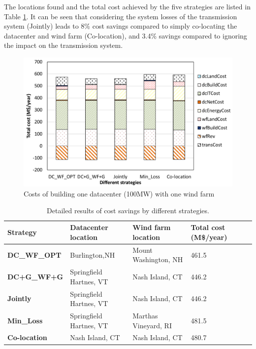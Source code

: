 The locations found and the total cost achieved by the five
strategies are listed in Table \ref{tab:costsaving}. It can be seen that 
considering the system losses of the transmission system (Jointly) leads to
 8\% cost 
savings compared to simply co-locating the datacenter and wind farm
(Co-location), and 3.4\% savings compared to ignoring the impact on
the transmission system.

\begin{figure}[ht]
\centering
\includegraphics[width=1\columnwidth]{img/cost-one-dc-one-wf}
\caption{Costs of building one datacenter (100MW) with one wind farm}
\label{fig:cost1dc1wf}
\end{figure}

\begin{table}[ht]
\begin{center}
\caption{Detailed results of cost savings by different strategies.}
\begin{tabular}{|l|p{50pt}|p{50pt}|p{30pt}|p{20pt}|}
\hline
\textbf{Strategy}& \textbf{Datacenter location} &\textbf{Wind farm location} &\textbf{Total cost (M\$/year)}%
 \\
\hline
\textbf{DC\_WF\_OPT} &  Burlington,NH  & Mount Washington, NH & 461.5%
\\
\textbf{DC+G\_WF+G} &Springfield Hartnes, VT  & Nash Island, CT& 446.2%
\\
\textbf{Jointly} &Springfield Hartnes, VT&  Nash Island, CT & 446.2%
\\
\textbf{Min\_Loss} &Springfield Hartnes, VT & Marthas Vineyard, RI & 481.5%
\\
\textbf{Co-location}& Nash Island, CT &Nash Island, CT& 480.7%
\\
\hline
\end{tabular}
\label{tab:costsaving}
\end{center}
\vspace{-0.2in}
\end{table}

